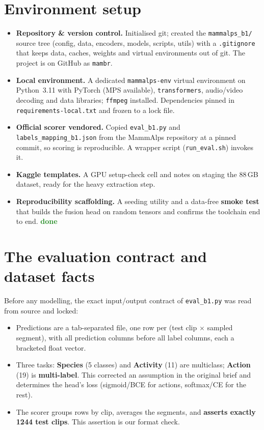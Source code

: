 \documentclass[11pt,a4paper]{article}
\newcommand{\done}{\textcolor{ForestGreen}{\textbf{done}}}
\begin{document}
\section{Environment setup}
\begin{itemize}
  \item \textbf{Repository \& version control.} Initialised git; created the
        \texttt{mammalps\_b1/} source tree (config, data, encoders, models, scripts, utils)
        with a \texttt{.gitignore} that keeps data, caches, weights and virtual environments
        out of git. The project is on GitHub as \texttt{mambr}.
  \item \textbf{Local environment.} A dedicated \texttt{mammalps-env} virtual environment on
        Python~3.11 with PyTorch (MPS available), \texttt{transformers}, audio/video decoding
        and data libraries; \texttt{ffmpeg} installed. Dependencies pinned in
        \texttt{requirements-local.txt} and frozen to a lock file.
  \item \textbf{Official scorer vendored.} Copied \texttt{eval\_b1.py} and
        \texttt{labels\_mapping\_b1.json} from the MammAlps repository at a pinned commit, so
        scoring is reproducible. A wrapper script (\texttt{run\_eval.sh}) invokes it.
  \item \textbf{Kaggle templates.} A GPU setup-check cell and notes on staging the 88\,GB
        dataset, ready for the heavy extraction step.
  \item \textbf{Reproducibility scaffolding.} A seeding utility and a data-free
        \textbf{smoke test} that builds the fusion head on random tensors and confirms the
        toolchain end to end. \done
\end{itemize}

\section{The evaluation contract and dataset facts}
Before any modelling, the exact input/output contract of \texttt{eval\_b1.py} was read from
source and locked:
\begin{itemize}
  \item Predictions are a tab-separated file, one row per (test clip $\times$ sampled
        segment), with all prediction columns before all label columns, each a bracketed
        float vector.
  \item Three tasks: \textbf{Species} (5 classes) and \textbf{Activity} (11) are multiclass;
        \textbf{Action} (19) is \textbf{multi-label}. This corrected an assumption in the
        original brief and determines the head's loss (sigmoid/BCE for actions, softmax/CE for
        the rest).
  \item The scorer groups rows by clip, averages the segments, and \textbf{asserts exactly
        1244 test clips}. This assertion is our format check.
\end{itemize}
\end{document}

